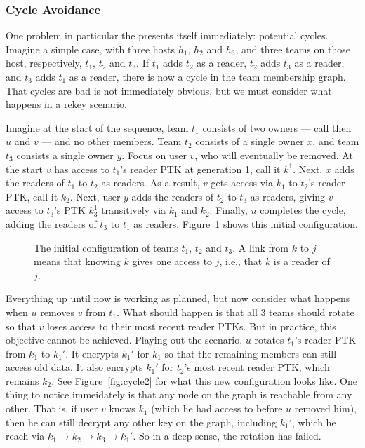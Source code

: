 \subsubsection{Cycle Avoidance}
\label{sec:team-index-range}

One problem in particular the presents itself immediately: potential cycles.
Imagine a simple case, with three hosts $h_1$, $h_2$ and $h_3$, and three teams
on those host, respectively, $t_1$, $t_2$ and $t_3$. If $t_1$ adds $t_2$ as a
reader, $t_2$ adds $t_3$ as a reader, and $t_3$ adds $t_1$ as a reader, there is
now a cycle in the team membership graph. That cycles are bad is not immediately
obvious, but we must consider what happens in a rekey scenario.

Imagine at the start of the sequence, team $t_1$ consists of two owners --- call
then $u$ and $v$ --- and no other members. Team $t_2$ consists of a single owner
$x$, and team $t_3$ consists a single owner $y$. Focus on user $v$, who will
eventually be removed.  At the start $v$ has access to $t_1$'s reader PTK at
generation 1, call it $k^{1}$.  Next, $x$ adds the readers of $t_1$ to $t_2$
as readers. As a result, $v$ gets access via $k_1$ to $t_2$'s reader PTK,
call it $k_2$. Next, user $y$ adds the readers of $t_2$ to $t_3$ as readers,
giving $v$ access to $t_3$'s PTK $k_3^{1}$ transitively via $k_1$ and $k_2$.
Finally, $u$ completes the cycle, adding the readers of $t_3$ to $t_1$ as readers.
Figure~\ref{fig:cycle1} shows this initial configuration. 

\begin{figure}[ht]
    \centering
    \caption{The initial configuration of teams $t_1$, $t_2$ and $t_3$.
A link from $k$ to $j$ means that knowing $k$ gives one access to $j$, i.e., that $k$ is a reader of $j$.}
    \label{fig:cycle1}
\end{figure}


Everything up until now is working as planned, but now consider what happens when
$u$ removes $v$ from $t_1$. What should happen is that all 3 teams should 
rotate so that $v$ loses access to their most recent reader PTKs. But in practice, this
objective cannot be achieved. Playing out the scenario, $u$ rotates $t_1$'s reader PTK
from $k_1$ to $k_1'$. It encrypts $k_1'$ for $k_1$ so that the remaining 
members can still access old data. It also encrypts $k_1'$ for $t_2$'s most recent reader
PTK, which remains $k_2$. See Figure~\ref{fig:cycle2} for what this new configuration looks like.
One thing to notice immeidately is that any node on the graph is reachable from any other. That is,
if user $v$ knows $k_1$ (which he had access to before $u$ removed him), then he can still
decrypt any other key on the graph, including $k_1'$, which he reach via
$k_1 \rightarrow k_2 \rightarrow k_3 \rightarrow k_1'$. So in a deep sense, the 
rotation has failed. 


